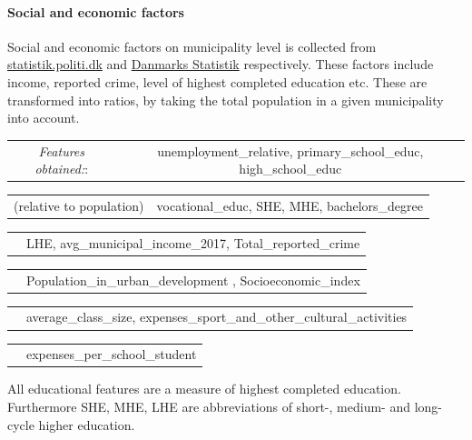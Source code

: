 \documentclass[12pt,a4paper]{article}
\begin{document}
\paragraph{Social and economic factors\newline}
Social and economic factors on municipality level is collected from \href{https://statistik.politi.dk/QvAJAXZfc/opendoc.htm?document=QlikApplication%2F2999_Public\%2FPublic_IndsatsResultater.qvw}{statistik.politi.dk} and  
\href{https://www.dst.dk/da/Statistik/emner/befolkning-og-valg}{Danmarks Statistik} respectively. These factors include income, reported crime, level of highest completed education etc. These are transformed into ratios, by taking the total population in a given municipality into account.   
 \vspace*{5px} \newline
\begin{tabular}{c c}
\textit{Features obtained:}: & unemployment\_relative, primary\_school\_educ, high\_school\_educ \\	
\end{tabular}\newline 
\begin{tabular}{c c}
\small (relative to population) & vocational\_educ,	 SHE, 	MHE, bachelors\_degree  \\	
\end{tabular}\newline 
\begin{tabular}{c c}
\qquad \qquad \qquad \qquad \quad & LHE, avg\_municipal\_income\_2017, Total\_reported\_crime\\	
\end{tabular}\newline 
\begin{tabular}{c c}
\qquad \qquad \qquad \qquad \quad & Population\_in\_urban\_development  , Socioeconomic\_index \\	
\end{tabular}\newline 
\begin{tabular}{c c}
\qquad \qquad \qquad \qquad \quad & average\_class\_size,	expenses\_sport\_and\_other\_cultural\_activities	  \\	
\end{tabular}\newline 
\begin{tabular}{c c}
\qquad \qquad \qquad \qquad \quad & expenses\_per\_school\_student	   \\	
\end{tabular}\newline 
\small {All educational features are a measure of highest completed education. Furthermore SHE, MHE, LHE are abbreviations of short-, medium- and long-cycle higher education}. 
\normalsize
\end{document}
